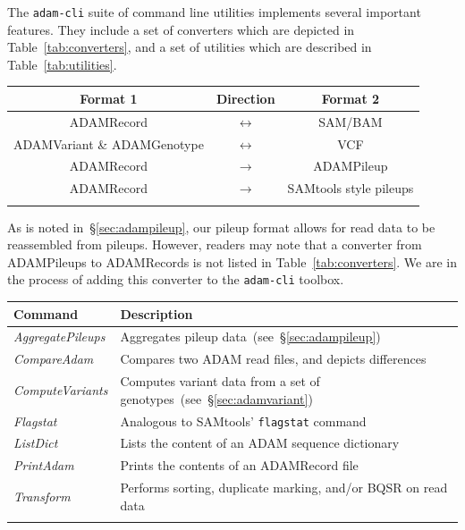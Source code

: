 \documentclass{bioinfo}
\begin{document}
The \texttt{adam-cli} suite of command line utilities implements several important features. They include a set of converters which are depicted in Table~\ref{tab:converters},
and a set of utilities which are described in Table~\ref{tab:utilities}.

\begin{table}[h]
{\begin{tabular}{ c c c }
\toprule
\bf Format 1 & \bf Direction & \bf Format 2 \\
\midrule
ADAMRecord & $\leftrightarrow$ & SAM/BAM \\
ADAMVariant \& ADAMGenotype & $\leftrightarrow$ & VCF \\
ADAMRecord & $\rightarrow$ & ADAMPileup \\
ADAMRecord & $\rightarrow$ & SAMtools style pileups \\
\botrule
\end{tabular}}{}
\end{table}

As is noted in~\S\ref{sec:adampileup}, our pileup format allows for read data to be reassembled from pileups. However, readers may note that a converter from ADAMPileups
to ADAMRecords is not listed in Table~\ref{tab:converters}. We are in the process of adding this converter to the \texttt{adam-cli} toolbox.

\begin{table}[h]
{\begin{tabular}{ l p{6cm} }
\toprule
\bf Command & \bf Description \\
\midrule
\textit{AggregatePileups} & Aggregates pileup data~(see~\S\ref{sec:adampileup}) \\
\textit{CompareAdam} & Compares two ADAM read files, and depicts differences \\
\textit{ComputeVariants} & Computes variant data from a set of genotypes~(see~\S\ref{sec:adamvariant}) \\
\textit{Flagstat} & Analogous to SAMtools' \texttt{flagstat} command \\
\textit{ListDict} & Lists the content of an ADAM sequence dictionary \\
\textit{PrintAdam} & Prints the contents of an ADAMRecord file \\
\textit{Transform} & Performs sorting, duplicate marking, and/or BQSR on read data \\
\botrule
\end{tabular}}{}
\end{table}
\end{document}
